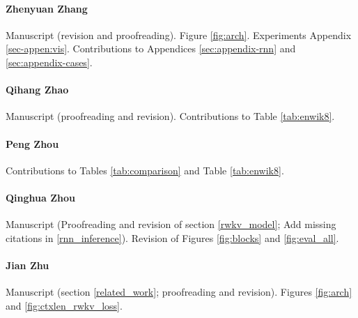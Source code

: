 \documentclass[11pt]{article}
\begin{document}
\paragraph{Zhenyuan Zhang} Manuscript (revision and proofreading). Figure \ref{fig:arch}. Experiments Appendix \ref{sec-appen:vis}. Contributions to Appendices \ref{sec:appendix-rnn} and \ref{sec:appendix-cases}.

\paragraph{Qihang Zhao} Manuscript (proofreading and revision). Contributions to Table \ref{tab:enwik8}.

\paragraph{Peng Zhou} Contributions to Tables \ref{tab:comparison} and Table \ref{tab:enwik8}.

\paragraph{Qinghua Zhou} Manuscript (Proofreading and revision of section \ref{rwkv_model}; Add missing citations in \ref{rnn_inference}). Revision of Figures \ref{fig:blocks} and \ref{fig:eval_all}.

\paragraph{Jian Zhu} Manuscript (section \ref{related_work}; proofreading and revision). Figures \ref{fig:arch} and \ref{fig:ctxlen_rwkv_loss}.
\end{document}
